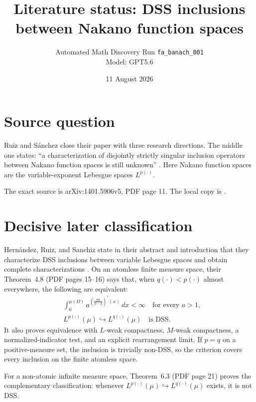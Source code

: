\documentclass[11pt]{article}
\title{Literature status: DSS inclusions\\between Nakano function spaces}
\author{Automated Math Discovery Run \texttt{fa\_banach\_001}\\Model: GPT5.6}
\date{11 August 2026}
\begin{document}
\maketitle

\begin{center}
\end{center}

\section*{Source question}

Ruiz and S\'anchez close their paper with three research directions.  The
middle one states: ``a characterization of disjointly strictly singular
inclusion operators between Nakano function spaces is still unknown''
\cite[p.~11, Open questions]{RS}.  Here Nakano function spaces are the
variable-exponent Lebesgue spaces $L^{p(\cdot)}$.

The exact source is arXiv:1401.5906v5, PDF page 11.  The local copy is
.

\section*{Decisive later classification}

Hern\'andez, Ruiz, and Sanchiz state in their abstract and introduction that
they characterize DSS inclusions between variable Lebesgue spaces and obtain
complete characterizations \cite{HRS}.  On an atomless finite measure space,
their Theorem~4.8 (PDF pages 15--16) says that, when
$q(\cdot)<p(\cdot)$ almost everywhere, the following are equivalent:
\begin{align*}
 &\int_0^{\mu(\Omega)}
 a^{\left(\frac{p q}{p-q}\right)^*(x)}\,dx<\infty
 \quad\text{for every }a>1,\\
 &L^{p(\cdot)}(\mu)\hookrightarrow L^{q(\cdot)}(\mu)
 \quad\text{is DSS}.
\end{align*}
It also proves equivalence with $L$-weak compactness, $M$-weak compactness,
a normalized-indicator test, and an explicit rearrangement limit.  If
$p=q$ on a positive-measure set, the inclusion is trivially non-DSS, so the
criterion covers every inclusion on the finite atomless space.

For a non-atomic infinite measure space, Theorem~6.3 (PDF page 21) proves the
complementary classification: whenever
$L^{p(\cdot)}(\mu)\hookrightarrow L^{q(\cdot)}(\mu)$ exists, it is not DSS.
\end{document}
